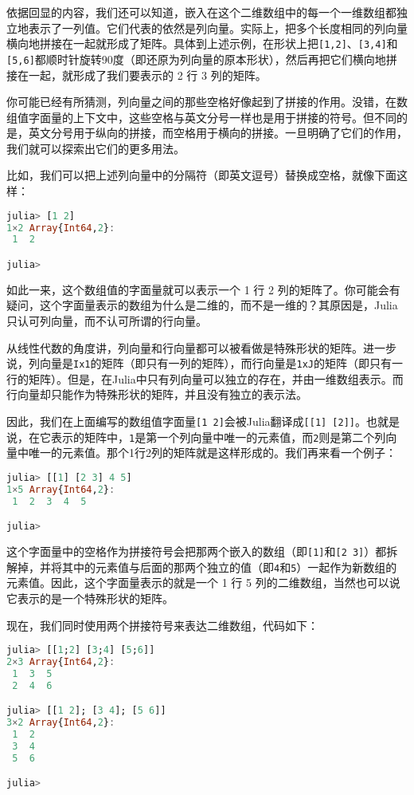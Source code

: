 依据回显的内容，我们还可以知道，嵌入在这个二维数组中的每一个一维数组都独立地表示了一列值。它们代表的依然是列向量。实际上，把多个长度相同的列向量横向地拼接在一起就形成了矩阵。具体到上述示例，在形状上把\verb`[1,2]`、\verb`[3,4]`和\verb`[5,6]`都顺时针旋转90度（即还原为列向量的原本形状），然后再把它们横向地拼接在一起，就形成了我们要表示的 2 行 3 列的矩阵。

你可能已经有所猜测，列向量之间的那些空格好像起到了拼接的作用。没错，在数组值字面量的上下文中，这些空格与英文分号一样也是用于拼接的符号。但不同的是，英文分号用于纵向的拼接，而空格用于横向的拼接。一旦明确了它们的作用，我们就可以探索出它们的更多用法。

比如，我们可以把上述列向量中的分隔符（即英文逗号）替换成空格，就像下面这样：

\begin{lstlisting}[language=julia]
julia> [1 2]
1×2 Array{Int64,2}:
 1  2

julia> 
\end{lstlisting}

如此一来，这个数组值的字面量就可以表示一个 1 行 2 列的矩阵了。你可能会有疑问，这个字面量表示的数组为什么是二维的，而不是一维的？其原因是，Julia 只认可列向量，而不认可所谓的行向量。

从线性代数的角度讲，列向量和行向量都可以被看做是特殊形状的矩阵。进一步说，列向量是\verb`Ix1`的矩阵（即只有一列的矩阵），而行向量是\verb`1xJ`的矩阵（即只有一行的矩阵）。但是，在Julia中只有列向量可以独立的存在，并由一维数组表示。而行向量却只能作为特殊形状的矩阵，并且没有独立的表示法。

因此，我们在上面编写的数组值字面量\verb`[1 2]`会被Julia翻译成\verb`[[1] [2]]`。也就是说，在它表示的矩阵中，\verb`1`是第一个列向量中唯一的元素值，而\verb`2`则是第二个列向量中唯一的元素值。那个1行2列的矩阵就是这样形成的。我们再来看一个例子：

\begin{lstlisting}[language=julia]
julia> [[1] [2 3] 4 5]
1×5 Array{Int64,2}:
 1  2  3  4  5

julia> 
\end{lstlisting}

这个字面量中的空格作为拼接符号会把那两个嵌入的数组（即\verb`[1]`和\verb`[2 3]`）都拆解掉，并将其中的元素值与后面的那两个独立的值（即\verb`4`和\verb`5`）一起作为新数组的元素值。因此，这个字面量表示的就是一个 1 行 5 列的二维数组，当然也可以说它表示的是一个特殊形状的矩阵。

现在，我们同时使用两个拼接符号来表达二维数组，代码如下：

\begin{lstlisting}[language=julia]
julia> [[1;2] [3;4] [5;6]]
2×3 Array{Int64,2}:
 1  3  5
 2  4  6

julia> [[1 2]; [3 4]; [5 6]]
3×2 Array{Int64,2}:
 1  2
 3  4
 5  6

julia> 
\end{lstlisting}

